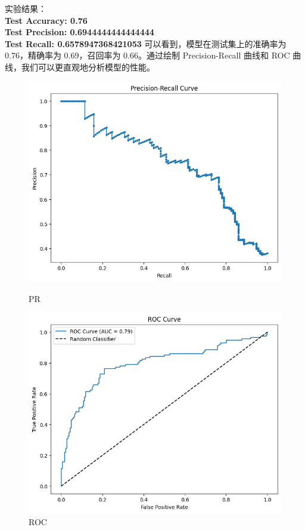 \documentclass[12pt,a4paper,oneside]{article}
\begin{document}
实验结果：
\textbf{\\
Test Accuracy: 0.76\\
Test Precision: 0.6944444444444444\\
Test Recall: 0.6578947368421053}
可以看到，模型在测试集上的准确率为 0.76，精确率为 0.69，召回率为 0.66。通过绘制 Precision-Recall 曲线和 ROC 曲线，我们可以更直观地分析模型的性能。\\

\begin{figure}[H]
    \centering
    \begin{minipage}{0.5\textwidth}
        \centering
        \includegraphics[width=\textwidth]{image/PR} %
        \caption{PR}
        \label{fig:image6}
    \end{minipage}
    \begin{minipage}{0.5\textwidth}
        \centering
        \includegraphics[width=\textwidth]{image/RC} %
        \caption{ROC}
        \label{fig:image7}
    \end{minipage}
\end{figure}
\end{document}
